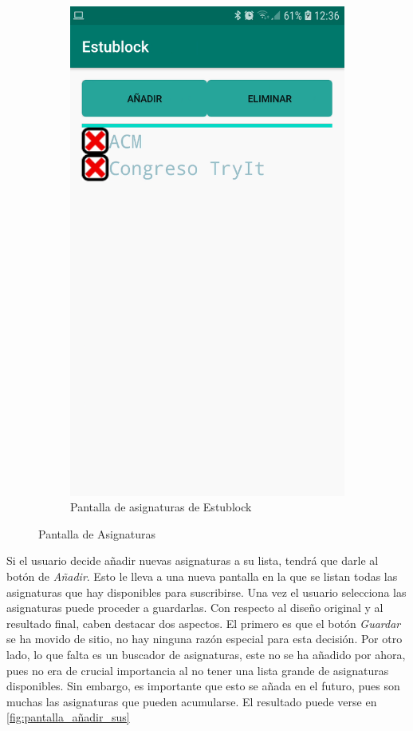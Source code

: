 \begin{figure}[hbt]
\begin{subfigure}[b]{0.4\linewidth}
        \includegraphics[width=0.7\linewidth]{figs/Desarrollo/Interfaz/estublock_asignaturas_suscritas}
        \caption[Estublock Asignaturas]{Pantalla de asignaturas de Estublock}
	\end{subfigure} 
	\caption[Pantalla de Asignaturas]{Pantalla de Asignaturas}
	\label{fig:pantalla_asignaturas}
\end{figure}

Si el usuario decide añadir nuevas asignaturas a su lista, tendrá que darle al botón de \textit{Añadir}. Esto le lleva a una nueva pantalla en la que se listan todas las asignaturas que hay disponibles para suscribirse. Una vez el usuario selecciona las asignaturas puede proceder a guardarlas. Con respecto al diseño original y al resultado final, caben destacar dos aspectos. El primero es que el botón \textit{Guardar} se ha movido de sitio, no hay ninguna razón especial para esta decisión. Por otro lado, lo que falta es un buscador de asignaturas, este no se ha añadido por ahora, pues no era de crucial importancia al no tener una lista grande de asignaturas disponibles. Sin embargo, es importante que esto se añada en el futuro, pues son muchas las asignaturas que pueden acumularse. El resultado puede verse en \ref{fig:pantalla_añadir_sus}


